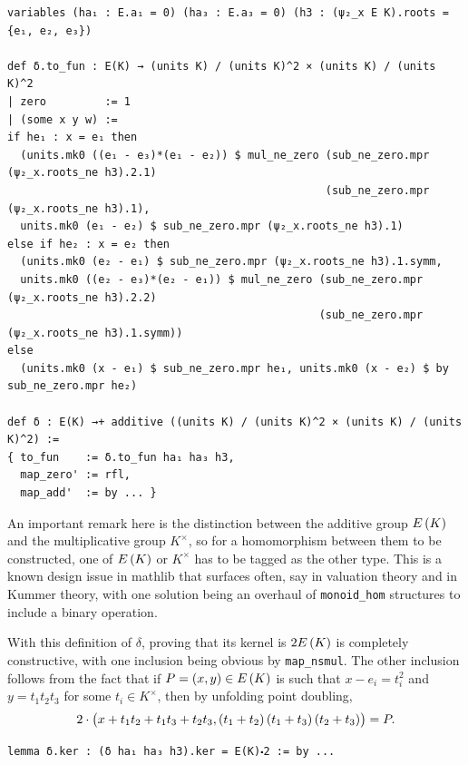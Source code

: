 \begin{lstlisting}[frame=single]
variables (ha₁ : E.a₁ = 0) (ha₃ : E.a₃ = 0) (h3 : (ψ₂_x E K).roots = {e₁, e₂, e₃})

def δ.to_fun : E(K) → (units K) / (units K)^2 × (units K) / (units K)^2
| zero         := 1
| (some x y w) :=
if he₁ : x = e₁ then
  (units.mk0 ((e₁ - e₃)*(e₁ - e₂)) $ mul_ne_zero (sub_ne_zero.mpr (ψ₂_x.roots_ne h3).2.1)
                                                 (sub_ne_zero.mpr (ψ₂_x.roots_ne h3).1),
  units.mk0 (e₁ - e₂) $ sub_ne_zero.mpr (ψ₂_x.roots_ne h3).1)
else if he₂ : x = e₂ then
  (units.mk0 (e₂ - e₁) $ sub_ne_zero.mpr (ψ₂_x.roots_ne h3).1.symm,
  units.mk0 ((e₂ - e₃)*(e₂ - e₁)) $ mul_ne_zero (sub_ne_zero.mpr (ψ₂_x.roots_ne h3).2.2)
                                                (sub_ne_zero.mpr (ψ₂_x.roots_ne h3).1.symm))
else
  (units.mk0 (x - e₁) $ sub_ne_zero.mpr he₁, units.mk0 (x - e₂) $ by sub_ne_zero.mpr he₂)

def δ : E(K) →+ additive ((units K) / (units K)^2 × (units K) / (units K)^2) :=
{ to_fun    := δ.to_fun ha₁ ha₃ h3,
  map_zero' := rfl,
  map_add'  := by ... }
\end{lstlisting}

An important remark here is the distinction between the additive group $ E\br{K} $ and the multiplicative group $ K^\times $, so for a homomorphism between them to be constructed, one of $ E\br{K} $ or $ K^\times $ has to be tagged as the other type. This is a known design issue in mathlib that surfaces often, say in valuation theory and in Kummer theory, with one solution being an overhaul of \texttt{monoid\_hom} structures to include a binary operation.

With this definition of $ \delta $, proving that its kernel is $ 2E\br{K} $ is completely constructive, with one inclusion being obvious by \texttt{map\_nsmul}. The other inclusion follows from the fact that if $ P = \br{x, y} \in E\br{K} $ is such that $ x - e_i = t_i^2 $ and $ y = t_1t_2t_3 $ for some $ t_i \in K^\times $, then by unfolding point doubling,
$$ 2 \cdot \br{x + t_1t_2 + t_1t_3 + t_2t_3, \br{t_1 + t_2}\br{t_1 + t_3}\br{t_2 + t_3}} = P. $$

\begin{lstlisting}[frame=single]
lemma δ.ker : (δ ha₁ ha₃ h3).ker = E(K)⬝2 := by ...
\end{lstlisting}

